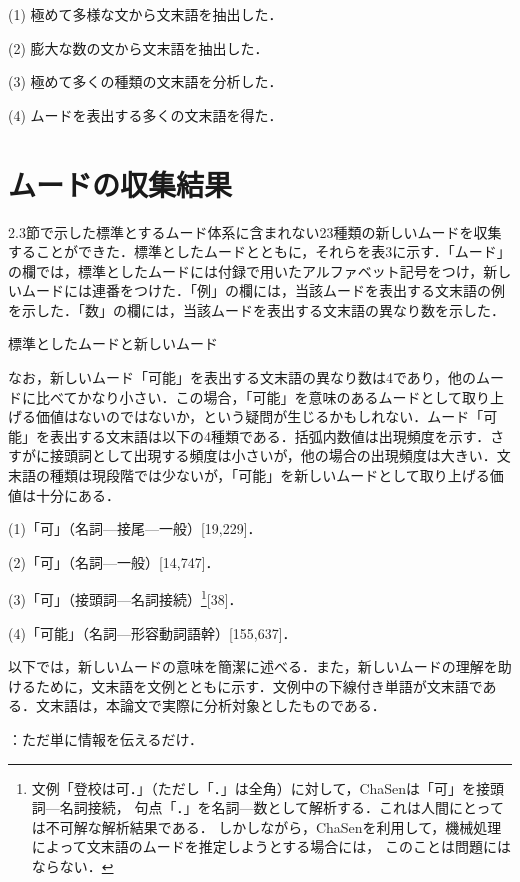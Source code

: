 \documentclass[japanese]{jnlp_1.4}
\newcommand{\InHone}[1]{}
\begin{document}
(1) 極めて多様な文から文末語を抽出した．

(2) 膨大な数の文から文末語を抽出した．

(3) 極めて多くの種類の文末語を分析した．

(4) ムードを表出する多くの文末語を得た．


\section{ムードの収集結果}

2.3節で示した標準とするムード体系に含まれない23種類の新しいムードを収集することができた．標準としたムードとともに，それらを表3に示す．「ムード」の欄では，標準としたムードには付録で用いたアルファベット記号をつけ，新しいムードには連番をつけた．「例」の欄には，当該ムードを表出する文末語の例を示した．「数」の欄には，当該ムードを表出する文末語の異なり数を示した．

\begin{table}[t]
\caption{標準としたムードと新しいムード}

\end{table}

なお，新しいムード「可能」を表出する文末語の異なり数は4であり，他のムードに比べてかなり小さい．この場合，「可能」を意味のあるムードとして取り上げる価値はないのではないか，という疑問が生じるかもしれない．ムード「可能」を表出する文末語は以下の4種類である．括弧内数値は出現頻度を示す．さすがに接頭詞として出現する頻度は小さいが，他の場合の出現頻度は大きい．文末語の種類は現段階では少ないが，「可能」を新しいムードとして取り上げる価値は十分にある．

(1)「可」（名詞—接尾—一般）[19,229]．

(2)「可」（名詞—一般）[14,747]．

(3)「可」（接頭詞—名詞接続）\footnote{
	文例「登校は可．」（ただし「．」は全角）に対して，ChaSenは「可」を接頭詞—名詞接続，
	句点「．」を名詞—数として解析する．これは人間にとっては不可解な解析結果である．
	しかしながら，ChaSenを利用して，機械処理によって文末語のムードを推定しようとする場合には，
	このことは問題にはならない．}[38]．

(4)「可能」（名詞—形容動詞語幹）[155,637]．

以下では，新しいムードの意味を簡潔に述べる．また，新しいムードの理解を助けるために，文末語を文例とともに示す．文例中の下線付き単語が文末語である．文末語は，本論文で実際に分析対象としたものである．

\InHone{(1)}
：ただ単に情報を伝えるだけ．
\end{document}
